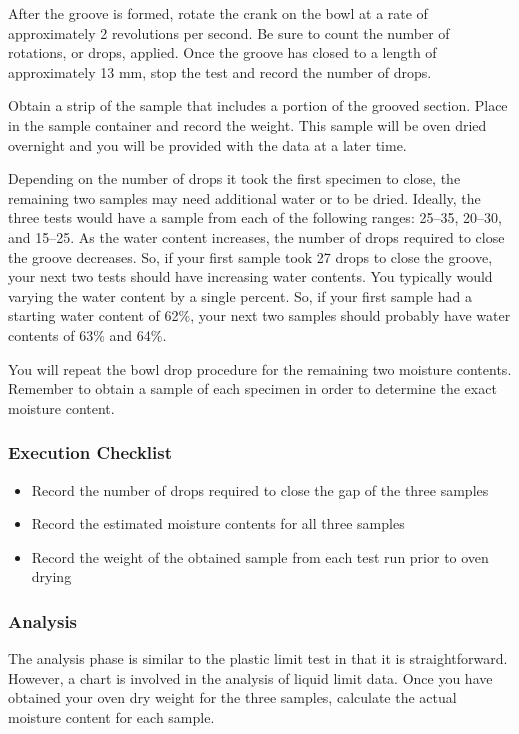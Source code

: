 \documentclass[12pt]{article}
\begin{document}
After the groove is formed, rotate the crank on the bowl at a rate of approximately 2 revolutions per second. Be sure to count the number of rotations, or drops, applied. Once the groove has closed to a length of approximately 13 mm, stop the test and record the number of drops.

Obtain a strip of the sample that includes a portion of the grooved section. Place in the sample container and record the weight. This sample will be oven dried overnight and you will be provided with the data at a later time.

Depending on the number of drops it took the first specimen to close, the remaining two samples may need additional water or to be dried. Ideally, the three tests would have a sample from each of the following ranges: 25--35, 20--30, and 15--25. As the water content increases, the number of drops required to close the groove decreases. So, if your first sample took 27 drops to close the groove, your next two tests should have increasing water contents. You typically would varying the water content by a single percent. So, if your first sample had a starting water content of 62\%, your next two samples should probably have water contents of 63\% and 64\%.

You will repeat the bowl drop procedure for the remaining two moisture contents. Remember to obtain a sample of each specimen in order to determine the exact moisture content.

\subsubsection*{Execution Checklist}
\begin{itemize}
    \item Record the number of drops required to close the gap of the three samples
    \item Record the estimated moisture contents for all three samples
    \item Record the weight of the obtained sample from each test run prior to oven drying
\end{itemize}

\subsubsection{Analysis}
The analysis phase is similar to the plastic limit test in that it is straightforward. However, a chart is involved in the analysis of liquid limit data. Once you have obtained your oven dry weight for the three samples, calculate the actual moisture content for each sample.
\end{document}
